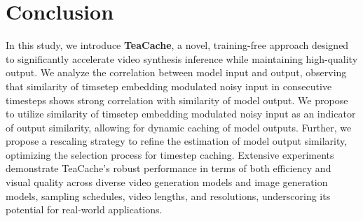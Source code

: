 \section{Conclusion}
In this study, we introduce \textbf{TeaCache}, a novel, training-free approach designed to significantly accelerate video synthesis inference while maintaining high-quality output. We analyze the correlation between model input and output,  observing that similarity of timsetep embedding modulated noisy input in consecutive timesteps shows strong correlation with similarity of model output. We propose to utilize similarity of timsetep embedding modulated noisy input as an indicator of output similarity, allowing for dynamic caching of model outputs. Further, we propose a rescaling strategy to refine the estimation of model output similarity,  optimizing the selection process for timestep caching. Extensive experiments demonstrate TeaCache's robust performance in terms of both efficiency and visual quality across diverse video generation models and image generation models, sampling schedules, video lengths, and resolutions, underscoring its potential for real-world applications.
\vspace{-0.4cm}